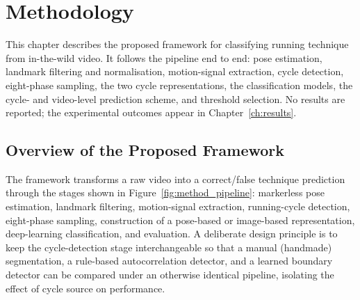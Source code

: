 %
%

\chapter{Methodology}
\label{ch:methodology}

This chapter describes the proposed framework for classifying running technique
from in-the-wild video. It follows the pipeline end to end: pose estimation,
landmark filtering and normalisation, motion-signal extraction, cycle detection,
eight-phase sampling, the two cycle representations, the classification models,
the cycle- and video-level prediction scheme, and threshold selection. No
results are reported; the experimental outcomes appear in
Chapter~\ref{ch:results}.

\section{Overview of the Proposed Framework}
\label{sec:method-overview}

The framework transforms a raw video into a correct/false technique prediction
through the stages shown in Figure~\ref{fig:method_pipeline}: markerless pose
estimation, landmark filtering, motion-signal extraction, running-cycle
detection, eight-phase sampling, construction of a pose-based or image-based
representation, deep-learning classification, and evaluation. A deliberate
design principle is to keep the cycle-detection stage interchangeable so that a
manual (handmade) segmentation, a rule-based autocorrelation detector, and a
learned boundary detector can be compared under an otherwise identical pipeline,
isolating the effect of cycle source on performance.

